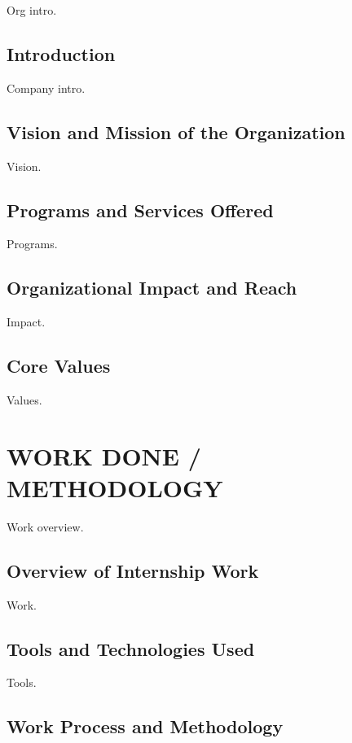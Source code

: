 \documentclass[12pt,a4paper]{report}
\begin{document}
Org intro.


\section{Introduction}

Company intro.




\section{Vision and Mission of the Organization}

Vision.


\section{Programs and Services Offered}

Programs.


\section{Organizational Impact and Reach}

Impact.


\section{Core Values}

Values.




\chapter{WORK DONE / METHODOLOGY}


Work overview.


\section{Overview of Internship Work}

Work.


\section{Tools and Technologies Used}

Tools.




\section{Work Process and Methodology}
\end{document}
